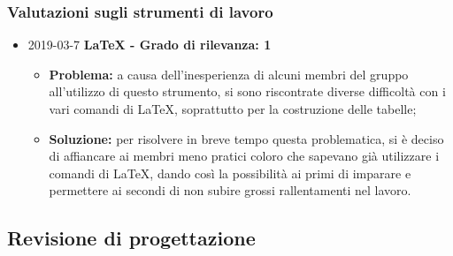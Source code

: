 \subsubsection{Valutazioni sugli strumenti di lavoro}
\begin{itemize}
				
		\item 2019-03-7 \textbf{\LaTeX{} - Grado di rilevanza: 1} \\
		\begin{itemize}
			\item \textbf{Problema:} a causa dell'inesperienza di alcuni membri del gruppo all'utilizzo di questo strumento, si sono riscontrate diverse difficoltà con i vari comandi di \LaTeX{}, soprattutto per la costruzione delle tabelle;
			\item \textbf{Soluzione:} per risolvere in breve tempo questa problematica, si è deciso di affiancare
		ai membri meno pratici coloro che sapevano già utilizzare i comandi di \LaTeX{}, dando
		così la possibilità ai primi di imparare e permettere ai secondi di non 
		subire grossi rallentamenti nel lavoro.
		\end{itemize}		
		
\end{itemize}

\subsection{Revisione di progettazione}